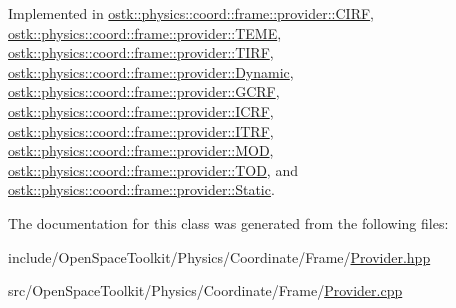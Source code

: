 Implemented in \hyperlink{classostk_1_1physics_1_1coord_1_1frame_1_1provider_1_1_c_i_r_f_affec3924a864a0d793ee5aa887a06cf8}{ostk\+::physics\+::coord\+::frame\+::provider\+::\+C\+I\+RF}, \hyperlink{classostk_1_1physics_1_1coord_1_1frame_1_1provider_1_1_t_e_m_e_a8a1c5599411f152c63b69819e89b0464}{ostk\+::physics\+::coord\+::frame\+::provider\+::\+T\+E\+ME}, \hyperlink{classostk_1_1physics_1_1coord_1_1frame_1_1provider_1_1_t_i_r_f_ac7f3d815a45e270adab07bf6f51dc25f}{ostk\+::physics\+::coord\+::frame\+::provider\+::\+T\+I\+RF}, \hyperlink{classostk_1_1physics_1_1coord_1_1frame_1_1provider_1_1_dynamic_ab01d8d9a09df8e46680eb1acb830a86c}{ostk\+::physics\+::coord\+::frame\+::provider\+::\+Dynamic}, \hyperlink{classostk_1_1physics_1_1coord_1_1frame_1_1provider_1_1_g_c_r_f_a02160b74124b3ece74912c62aae5caaa}{ostk\+::physics\+::coord\+::frame\+::provider\+::\+G\+C\+RF}, \hyperlink{classostk_1_1physics_1_1coord_1_1frame_1_1provider_1_1_i_c_r_f_a0d8e56478597e46dbc2c1867e6774398}{ostk\+::physics\+::coord\+::frame\+::provider\+::\+I\+C\+RF}, \hyperlink{classostk_1_1physics_1_1coord_1_1frame_1_1provider_1_1_i_t_r_f_a2f3a53b002d54f1adf829cefc2cf7393}{ostk\+::physics\+::coord\+::frame\+::provider\+::\+I\+T\+RF}, \hyperlink{classostk_1_1physics_1_1coord_1_1frame_1_1provider_1_1_m_o_d_a0b6a40a222857ad032f5d5a8d228ab16}{ostk\+::physics\+::coord\+::frame\+::provider\+::\+M\+OD}, \hyperlink{classostk_1_1physics_1_1coord_1_1frame_1_1provider_1_1_t_o_d_a57f8d993ac693b2cd39b4a99faadc92f}{ostk\+::physics\+::coord\+::frame\+::provider\+::\+T\+OD}, and \hyperlink{classostk_1_1physics_1_1coord_1_1frame_1_1provider_1_1_static_a5b7189d8cff8128fee348af2feac1304}{ostk\+::physics\+::coord\+::frame\+::provider\+::\+Static}.



The documentation for this class was generated from the following files\+:\begin{DoxyCompactItemize}
\item 
include/\+Open\+Space\+Toolkit/\+Physics/\+Coordinate/\+Frame/\hyperlink{_provider_8hpp}{Provider.\+hpp}\item 
src/\+Open\+Space\+Toolkit/\+Physics/\+Coordinate/\+Frame/\hyperlink{_provider_8cpp}{Provider.\+cpp}\end{DoxyCompactItemize}
